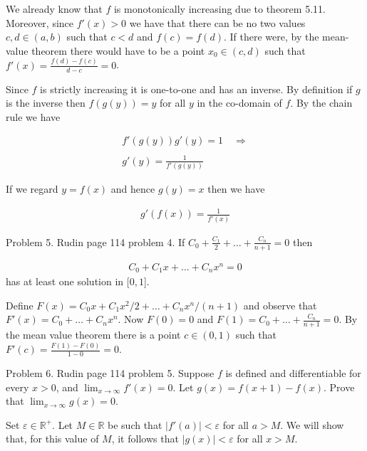 \documentclass{article}
\begin{document}
  \vspace{1cm}

  We already know that $f$ is monotonically increasing due to theorem 5.11.  Moreover, since $f'(x) >0$ we have that there can be no two values $c,d\in (a,b)$ such that $c < d$ and $f(c)=f(d)$.  If there were, by the mean-value theorem there would have to be a point $x_0\in (c,d)$ such that $f'(x) = \frac{f(d)-f(c)}{d-c} = 0$.

  Since $f$ is strictly increasing it is one-to-one and has an inverse.  By definition if $g$ is the inverse then $f(g(y)) = y$ for all $y$ in the co-domain of $f$.  By the chain rule we have

  \begin{align*}
    f'(g(y))g'(y) = 1 \quad \Rightarrow\\\\
    g'(y) = \frac{1}{f'(g(y))}
  \end{align*}

  If we regard $y = f(x)$ and hence $g(y) = x$ then we have

  \begin{align*}
    g'(f(x)) = \frac{1}{f'(x)}
  \end{align*}

  \pagebreak

  {\Large \color{Sepia} Problem 5. Rudin page 114 problem 4. If $C_0+\frac{C_1}{2}+\dots+\frac{C_n}{n+1}=0$ then

  \begin{align*}
    C_0+C_1x+\dots+C_nx^n = 0
  \end{align*}
  has at least one solution in [$0,1$].
  }

  \vspace{1cm}

  Define $F(x) = C_0x + C_1x^2/2 + \dots + C_nx^n/(n+1)$ and observe that $F'(x) = C_0+\dots+C_nx^n$.  Now $F(0)=0$ and $F(1)=C_0+\dots+\frac{C_n}{n+1}=0$.  By the mean value theorem there is a point $c\in (0,1)$ such that $F'(c) = \frac{F(1)-F(0)}{1-0} = 0$.

  \pagebreak

  {\Large \color{Sepia} Problem 6. Rudin page 114 problem 5. Suppose $f$ is defined and differentiable for every $x>0$, and $\displaystyle\lim_{x\to \infty}f'(x) = 0$.  Let $g(x)=f(x+1)-f(x)$.  Prove that $\displaystyle \lim_{x\to \infty}g(x)=0$.}

  \vspace{1cm}

  Set $\varepsilon\in\mathbb R^+$.  Let $M\in\mathbb R$ be such that $|f'(a)|<\varepsilon$ for all $a>M$.  We will show that, for this value of $M$, it follows that $|g(x)|<\varepsilon$ for all $x>M$.
\end{document}
